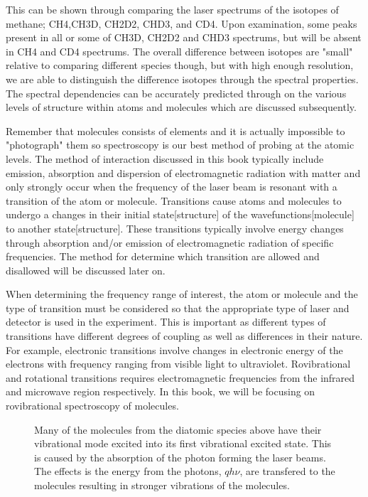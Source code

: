 \documentclass[11pt,a4paper]{book}
\newcommand{\imginput}[1]{} %
\begin{document}
		This can be shown through comparing the laser spectrums of
		the isotopes of methane; CH4,CH3D, CH2D2, CHD3, and CD4. Upon examination, some peaks present in all or some of CH3D, CH2D2 and CHD3 spectrums, but will be absent in CH4 and CD4 spectrums. The overall difference between isotopes are "small" relative to comparing different species though, but with high enough resolution, we are able to distinguish the difference isotopes through the spectral properties. The spectral dependencies can be accurately predicted through on the various levels of structure within atoms and molecules which are discussed subsequently.
		
		Remember that molecules consists of elements and it is actually impossible to "photograph" them so spectroscopy is our best method of probing at the atomic levels. The method of interaction discussed in this book typically include emission, absorption and dispersion of electromagnetic radiation with matter and only strongly occur when the frequency of the laser beam is resonant with a transition of the atom or molecule. Transitions cause atoms and molecules to undergo a changes in their initial state[structure] of the wavefunctions[molecule] to another state[structure]. These transitions typically involve energy changes through absorption and/or emission of electromagnetic radiation of specific frequencies. The method for determine which transition are allowed and disallowed will be discussed later on. 
		
		When determining the frequency range of interest, the atom or molecule and the type of transition must be considered so that the appropriate type of laser and detector is used in the experiment. This is important as different types of transitions have different degrees of coupling as well as differences in their nature. For example, electronic transitions involve changes in electronic energy of the electrons with frequency ranging from visible light to ultraviolet. Rovibrational and rotational transitions requires electromagnetic frequencies from the infrared and microwave region respectively. In this book, we will be focusing on rovibrational spectroscopy of molecules.
	
		\begin{figure} [!ht]
			\centering
			\def\svgwidth{\columnwidth}
			\resizebox{15cm}{!}{\imginput{images/abs-rovib-trans.pdf_tex}}
			\caption{Many of the molecules from the  diatomic species above have their vibrational mode  excited into its first vibrational excited state. This is caused by the absorption of the photon forming the laser beams. The effects is the energy from the photons, $qh\nu$, are transfered to the molecules resulting in stronger vibrations of the molecules.}
			\label{fig:abs-rovib-trans}
		\end{figure}	
		
\end{document}
